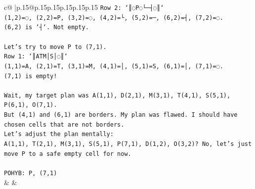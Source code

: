 \documentclass{article}
\begin{document}
{\begin{supertabular}{c@{$\;$}|p{.15\linewidth}@{}p{.15\linewidth}p{.15\linewidth}p{.15\linewidth}p{.15\linewidth}p{.15\linewidth}}
{{{\texttt{Row 2: `║◌P◌└─┤◌║`} \\
\texttt{(1,2)=◌, (2,2)=P, (3,2)=◌, (4,2)=└, (5,2)=─, (6,2)=┤, (7,2)=◌.} \\
\texttt{(6,2) is `┤`. Not empty.} \\
\\ 
\texttt{Let's try to move P to (7,1).} \\
\texttt{Row 1: `║ATM│S│◌║`} \\
\texttt{(1,1)=A, (2,1)=T, (3,1)=M, (4,1)=│, (5,1)=S, (6,1)=│, (7,1)=◌.} \\
\texttt{(7,1) is empty!} \\
\\ 
\texttt{Wait, my target plan was A(1,1), D(2,1), M(3,1), T(4,1), S(5,1), P(6,1), O(7,1).} \\
\texttt{But (4,1) and (6,1) are borders. My plan was flawed. I should have chosen cells that are not borders.} \\
\texttt{Let's adjust the plan mentally:} \\
\texttt{A(1,1), T(2,1), M(3,1), S(5,1), P(7,1), D(1,2), O(3,2)? No, let's just move P to a safe empty cell for now.} \\
\\ 
\texttt{POHYB: P, (7,1)} \\
            }
        }
    }
    & & \\ \\


\end{supertabular}}
\end{document}
